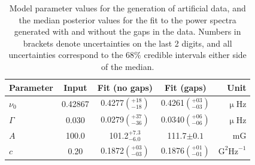 \begin{table}[ht!]
	\begin{center}
		\caption{Model parameter values for the generation of artificial data, and the median posterior values for the fit to the power spectra generated with and without the gaps in the data. Numbers in brackets denote uncertainties on the last 2 digits, and all uncertainties correspond to the $68 \%$ credible intervals either side of the median.}
		\label{tab:fake_1pk_params}
		\begin{tabular}{l c c c r}
			\hline
			{\bf Parameter} & {\bf Input} & {\bf Fit (no gaps)} & {\bf Fit (gaps)} & {\bf Unit} \\
			\hline
			
			{$\nu_0$} & {0.42867} & {0.4277$\left(_{-18}^{+18}\right)$} & {0.4261$\left(_{-03}^{+03}\right)$} & {$\upmu\mathrm{Hz} $}\\
			
			{$\Gamma$} & {0.030} & {0.0279$\left(_{-36}^{+37}\right)$} & {0.0340$\left(_{-06}^{+06}\right)$} & {$\upmu\mathrm{Hz} $} \\
			
			{$A$} & {100.0} & {101.2$_{-6.0}^{+7.3}$} & {111.7$\pm 0.1$} & {$\mathrm{mG}$} \\
			
			{$c$} & {0.20} & {0.1872$\left(_{-03}^{+03}\right)$} & {0.1876$\left(_{-01}^{+01}\right)$} & {$\mathrm{G}^2\mathrm{Hz}^{-1}$} \\	
			
			\hline
		\end{tabular}
	\end{center}
\end{table}


